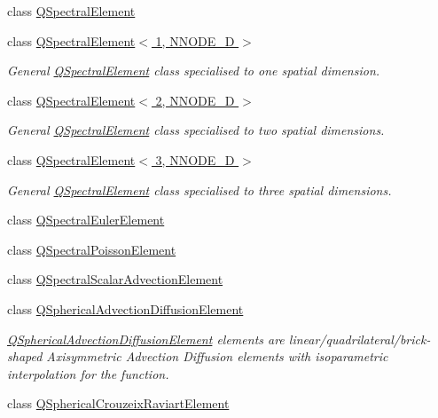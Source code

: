 \begin{DoxyCompactItemize}
class \hyperlink{classoomph_1_1QSpectralElement}{Q\+Spectral\+Element}
\item 
class \hyperlink{classoomph_1_1QSpectralElement_3_011_00_01NNODE__1D_01_4}{Q\+Spectral\+Element$<$ 1, N\+N\+O\+D\+E\+\_\+D $>$}
\begin{DoxyCompactList}\small\item\em General \hyperlink{classoomph_1_1QSpectralElement}{Q\+Spectral\+Element} class specialised to one spatial dimension. \end{DoxyCompactList}\item 
class \hyperlink{classoomph_1_1QSpectralElement_3_012_00_01NNODE__1D_01_4}{Q\+Spectral\+Element$<$ 2, N\+N\+O\+D\+E\+\_\+D $>$}
\begin{DoxyCompactList}\small\item\em General \hyperlink{classoomph_1_1QSpectralElement}{Q\+Spectral\+Element} class specialised to two spatial dimensions. \end{DoxyCompactList}\item 
class \hyperlink{classoomph_1_1QSpectralElement_3_013_00_01NNODE__1D_01_4}{Q\+Spectral\+Element$<$ 3, N\+N\+O\+D\+E\+\_\+D $>$}
\begin{DoxyCompactList}\small\item\em General \hyperlink{classoomph_1_1QSpectralElement}{Q\+Spectral\+Element} class specialised to three spatial dimensions. \end{DoxyCompactList}\item 
class \hyperlink{classoomph_1_1QSpectralEulerElement}{Q\+Spectral\+Euler\+Element}
\item 
class \hyperlink{classoomph_1_1QSpectralPoissonElement}{Q\+Spectral\+Poisson\+Element}
\item 
class \hyperlink{classoomph_1_1QSpectralScalarAdvectionElement}{Q\+Spectral\+Scalar\+Advection\+Element}
\item 
class \hyperlink{classoomph_1_1QSphericalAdvectionDiffusionElement}{Q\+Spherical\+Advection\+Diffusion\+Element}
\begin{DoxyCompactList}\small\item\em \hyperlink{classoomph_1_1QSphericalAdvectionDiffusionElement}{Q\+Spherical\+Advection\+Diffusion\+Element} elements are linear/quadrilateral/brick-\/shaped Axisymmetric Advection Diffusion elements with isoparametric interpolation for the function. \end{DoxyCompactList}\item 
class \hyperlink{classoomph_1_1QSphericalCrouzeixRaviartElement}{Q\+Spherical\+Crouzeix\+Raviart\+Element}

\end{DoxyCompactItemize}
